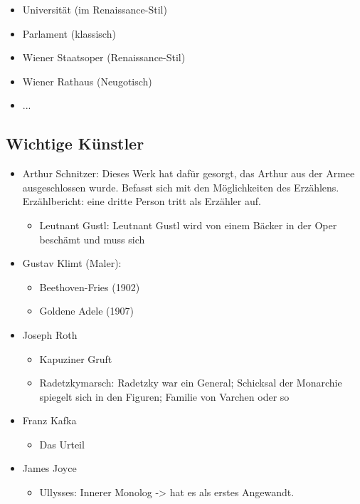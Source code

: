 \documentclass[12pt,a4paper]{article}
\begin{document}
\begin{itemize}
\item Universität (im Renaissance-Stil)
\item Parlament (klassisch)
\item Wiener Staatsoper (Renaissance-Stil)
\item Wiener Rathaus (Neugotisch)
\item ...
\end{itemize}

\subsection{Wichtige Künstler}

\begin{itemize}
\item Arthur Schnitzer: Dieses Werk hat dafür gesorgt, das Arthur aus der Armee ausgeschlossen wurde. Befasst sich mit den Möglichkeiten des Erzählens. Erzählbericht: eine dritte Person tritt als Erzähler auf.
	\begin{itemize}
	\item Leutnant Gustl: Leutnant Gustl wird von einem Bäcker in der Oper beschämt und muss sich
	\end{itemize}
\item Gustav Klimt (Maler):
	\begin{itemize}
	\item Beethoven-Fries (1902)
	\item Goldene Adele (1907)
	\end{itemize}
\item Joseph Roth
	\begin{itemize}
	\item Kapuziner Gruft
	\item Radetzkymarsch: Radetzky war ein General; Schicksal der Monarchie spiegelt sich in den Figuren; Familie von Varchen oder so
	\end{itemize}
\item Franz Kafka
	\begin{itemize}
	\item Das Urteil
	\end{itemize}
\end{itemize}
\begin{itemize}
\item James Joyce
	\begin{itemize}
	\item Ullysses: Innerer Monolog -> hat es als erstes Angewandt.
	\end{itemize}
\end{itemize}
\end{document}
